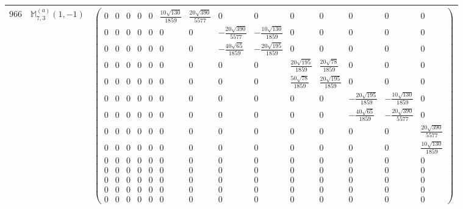 \documentclass[fleqn,8pt,landscape]{jsarticle}
\begin{document}
\begin{center}
\begin{longtable}{ccc}
$ 966 $ & $ \mathbb{M}_{7,3}^{(a)}(1,-1) $ & $ \begin{pmatrix} 0 & 0 & 0 & 0 & 0 & \frac{10 \sqrt{130}}{1859} & \frac{20 \sqrt{390}}{5577} & 0 & 0 & 0 & 0 & 0 & 0 & 0 \\ 0 & 0 & 0 & 0 & 0 & 0 & 0 & - \frac{20 \sqrt{390}}{5577} & - \frac{10 \sqrt{130}}{1859} & 0 & 0 & 0 & 0 & 0 \\ 0 & 0 & 0 & 0 & 0 & 0 & 0 & - \frac{40 \sqrt{65}}{1859} & - \frac{20 \sqrt{195}}{1859} & 0 & 0 & 0 & 0 & 0 \\ 0 & 0 & 0 & 0 & 0 & 0 & 0 & 0 & 0 & \frac{20 \sqrt{195}}{1859} & \frac{20 \sqrt{78}}{1859} & 0 & 0 & 0 \\ 0 & 0 & 0 & 0 & 0 & 0 & 0 & 0 & 0 & \frac{50 \sqrt{78}}{1859} & \frac{20 \sqrt{195}}{1859} & 0 & 0 & 0 \\ 0 & 0 & 0 & 0 & 0 & 0 & 0 & 0 & 0 & 0 & 0 & - \frac{20 \sqrt{195}}{1859} & - \frac{10 \sqrt{130}}{1859} & 0 \\ 0 & 0 & 0 & 0 & 0 & 0 & 0 & 0 & 0 & 0 & 0 & - \frac{40 \sqrt{65}}{1859} & - \frac{20 \sqrt{390}}{5577} & 0 \\ 0 & 0 & 0 & 0 & 0 & 0 & 0 & 0 & 0 & 0 & 0 & 0 & 0 & \frac{20 \sqrt{390}}{5577} \\ 0 & 0 & 0 & 0 & 0 & 0 & 0 & 0 & 0 & 0 & 0 & 0 & 0 & \frac{10 \sqrt{130}}{1859} \\ 0 & 0 & 0 & 0 & 0 & 0 & 0 & 0 & 0 & 0 & 0 & 0 & 0 & 0 \\ 0 & 0 & 0 & 0 & 0 & 0 & 0 & 0 & 0 & 0 & 0 & 0 & 0 & 0 \\ 0 & 0 & 0 & 0 & 0 & 0 & 0 & 0 & 0 & 0 & 0 & 0 & 0 & 0 \\ 0 & 0 & 0 & 0 & 0 & 0 & 0 & 0 & 0 & 0 & 0 & 0 & 0 & 0 \\ 0 & 0 & 0 & 0 & 0 & 0 & 0 & 0 & 0 & 0 & 0 & 0 & 0 & 0 \end{pmatrix} $ \\ \hline

\end{longtable}
\end{center}
\end{document}
